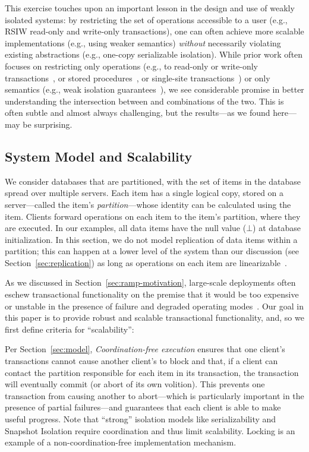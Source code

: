 This exercise touches upon an important
lesson in the design and use of weakly isolated systems: by
restricting the set of operations accessible to a user (e.g., RSIW
read-only and write-only transactions), one can often achieve more
scalable implementations (e.g., using weaker semantics)
\textit{without} necessarily violating existing abstractions (e.g.,
one-copy serializable isolation). While prior work often focuses on
restricting only operations (e.g., to read-only or write-only
transactions~\cite{eiger,divy-writeonly}, or stored
procedures~\cite{calvin,hstore,jones-dtxn}, or single-site
transactions~\cite{megastore}) or only semantics (e.g., weak isolation
guarantees~\cite{hat-vldb,eiger,explicit-socc}), we see
considerable promise in better understanding the intersection between
and combinations of the two. This is often subtle and almost always
challenging, but the results---as we found here---may be surprising.

 \subsection{System Model and Scalability}
\label{sec:sysmodel}

We consider databases that are partitioned, with the set of items in
the database spread over multiple servers. Each item has a single
logical copy, stored on a server---called the item's
\textit{partition}---whose identity can be calculated using the
item. Clients forward operations on each item to the item's partition,
where they are executed. In our examples, all data items have the null
value ($\bot$) at database initialization. In this section, we do not
model replication of data items within a partition; this can happen at
a lower level of the system than our discussion (see
Section~\ref{sec:replication}) as long as operations on each item are
linearizable~\cite{dcomp-book}.

 As we discussed in
Section~\ref{sec:ramp-motivation}, large-scale deployments often eschew
transactional functionality on the premise that it would be too
expensive or unstable in the presence of failure and degraded
operating
modes~\cite{ladis,tao,bigtable,pnuts,dynamo,helland-trans,2pc-scalability,espresso,rainbird}. Our
goal in this paper is to provide robust and scalable transactional
functionality, and, so we first define criteria for ``scalability'':

\vspace{.5em}\noindent Per Section~\ref{sec:model},
\textit{Coordination-free execution} ensures that one client's
transactions cannot cause another client's to block and that, if a
client can contact the partition responsible for each item in its
transaction, the transaction will eventually commit (or abort of its
own volition). This prevents one transaction from causing another to
abort---which is particularly important in the presence of partial
failures---and guarantees that each client is able to make useful
progress. Note that ``strong'' isolation models like serializability
and Snapshot Isolation require coordination and thus limit
scalability. Locking is an example of a non-coordination-free
implementation mechanism.\vspace{.5em}

